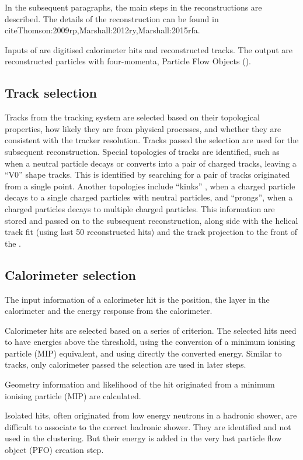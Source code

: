 In the subsequent paragraphs, the main steps in the \pandora reconstructions are described. The details of the reconstruction can be found in cite{Thomson:2009rp,Marshall:2012ry,Marshall:2015rfa}.

Inputs of \pandora are digitised calorimeter hits and reconstructed tracks. The output are reconstructed particles with four-momenta, Particle Flow Objects (\PFOs).

\subsection{Track selection}
\label{sec:pandoraPandoraTrack}
Tracks from the tracking system are selected based on their topological properties, how likely they are from physical processes, and whether they are consistent with the tracker resolution. Tracks passed the selection are used for the subsequent reconstruction.  Special topologies of tracks are identified, such as when a neutral particle decays or converts into a pair of charged tracks, leaving a ``V0''  shape tracks. This is identified by searching for a pair of tracks originated from a single point. Another topologies include ``kinks'' , when a charged particle decays to a single charged particles with neutral particles, and ``prongs'', when a charged particles decays to multiple charged particles. This information are stored and passed on to the subsequent reconstruction, along side with the helical track fit (using last 50 reconstructed hits) and the track projection to the front of the \ECAL.

\subsection{Calorimeter selection}

The input information of a calorimeter hit is the position, the layer in the calorimeter and the energy response from the calorimeter.

Calorimeter hits are selected based on a series of criterion. The selected hits need to have energies above the threshold, using the conversion of a minimum ionising particle (MIP) equivalent, and using directly the converted energy. Similar to tracks, only calorimeter passed the selection are used in later steps.

Geometry information and likelihood of the hit originated from a minimum ionising particle (MIP) are calculated.

Isolated hits, often originated from low energy neutrons in a hadronic shower, are difficult to associate to the correct hadronic shower. They are identified and not used in the clustering. But their energy is added in the very last particle flow object (PFO) creation step.

